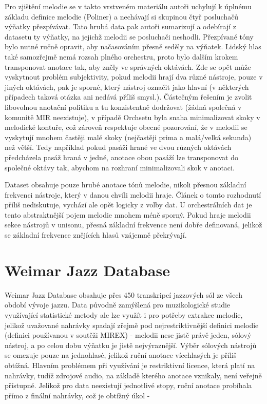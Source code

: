 Pro zjištění melodie se v takto vrstveném materiálu autoři uchylují k úplnému základu definice melodie (Poliner) a nechávají si skupinou čtyř posluchačů výňatky přezpívávat. Tato hrubá data pak autoři sumarizují a odebírají z datasetu ty výňatky, na jejichž melodii se posluchači neshodli. Přezpívané tóny bylo nutné ručně opravit, aby načasováním přesně seděly na výňatek. Lidský hlas také samozřejmě nemá rozsah plného orchestru, proto bylo dalším krokem transponovat anotace tak, aby zněly ve správných oktávách. Zde se opět může vyskytnout problém subjektivity, pokud melodii hrají dva různé nástroje, pouze v jiných oktávách, pak je sporné, který nástroj označit jako hlavní (v některých případech taková otázka ani nedává příliš smysl.). Částečným řešením je zvolit libovolnou anotační politiku a tu konzistentně dodržovat (žádná společná v komunitě MIR neexistuje), v případě Orchsetu byla snaha minimalizovat skoky v melodické kontuře, což zároveň respektuje obecné pozorování, že v melodii se vyskytují mnohem častěji malé skoky (nejčastěji prima a malá/velká sekunda) než větší. Tedy například pokud pasáži hrané ve dvou různých oktávách předcházela pasáž hraná v jedné, anotace obou pasáží lze transponovat do společné oktávy tak, abychom na rozhraní minimalizovali skok v anotaci.

Dataset obsahuje pouze hrubé anotace tónů melodie, nikoli přesnou základní frekvenci nástroje, který v danou chvíli melodii hraje. Článek o tomto rozhodnutí příliš nediskutuje, vychází ale opět logicky z volby dat. U orchestrálních dat je tento abstraktnější pojem melodie mnohem méně sporný. Pokud hraje melodii sekce nástrojů v unisonu, přesná základní frekvence není dobře definovaná, jelikož se základní frekvence znějících hlasů vzájemně překrývají.

\section{Weimar Jazz Database}

Weimar Jazz Database \cite{Pfleiderer} obsahuje přes 450 transkripcí jazzových sól ze všech období vývoje jazzu. Data původně zamýšlená pro muzikologické studie využívající statistické metody ale lze využít i pro potřeby extrakce melodie, jelikož uvažované nahrávky spadají zřejmě pod nejrestriktivnější definici melodie (definici používanou v soutěži MIREX) - melodii nese jistě právě jeden, sólový nástroj, a po celou dobu výňatku je jistě nejvýraznější. Výběr sólových nástrojů se omezuje pouze na jednohlasé, jelikož ruční anotace vícehlasých je příliš obtížná. Hlavním problémem při využívání je restriktivní licence, která platí na nahrávky, tudíž zdrojové audio, na základě kterého anotace vznikaly, není veřejně přístupné.
Jelikož pro data neexistují jednotlivé stopy, ruční anotace probíhala přímo z finální nahrávky, což je obtížný úkol - 
